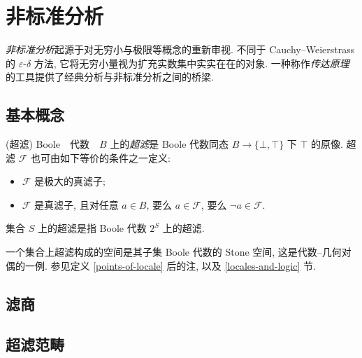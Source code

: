 \section{非标准分析}


\emph{非标准分析}起源于对无穷小与极限等概念的重新审视. 不同于 Cauchy--Weierstrass 的 $\varepsilon$-$\delta$ 方法, 它将无穷小量视为扩充实数集中实实在在的对象. 一种称作\emph{传达原理}的工具提供了经典分析与非标准分析之间的桥梁.

\subsection{基本概念}

\begin{definition}
	{(超滤)}
	Boole　代数　$B$ 上的\emph{超滤}是 Boole 代数同态 $B\to \{\bot,\top\}$ 下 $\top$ 的原像. 超滤 $\mathcal F$ 也可由如下等价的条件之一定义:
	\begin{itemize}
		\item $\mathcal F$ 是极大的真滤子;
		\item $\mathcal F$ 是真滤子, 且对任意 $a\in B$, 要么 $a\in\mathcal F$, 要么 $\neg a\in \mathcal F$.
	\end{itemize}
	集合 $S$ 上的超滤是指 Boole 代数 $2^S$ 上的超滤.
\end{definition}

\begin{remark}
	{}
	一个集合上超滤构成的空间是其子集 Boole 代数的 Stone 空间, 这是代数--几何对偶的一例. 参见定义 \ref{points-of-locale} 后的注, 以及 \ref{locales-and-logic} 节.
\end{remark}

\subsection{滤商}

\subsection{超滤范畴}